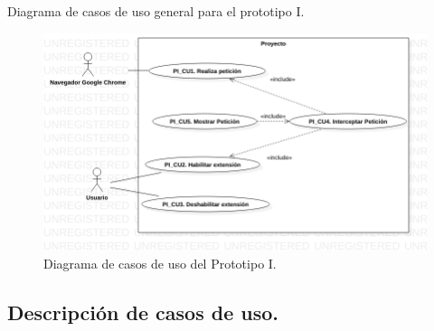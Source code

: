 \documentclass[12pt, a4paper, titlepage]{report}
\begin{document}
				Diagrama de casos de uso general para el prototipo I.
				\begin{figure}[htb]
					\begin{center}
			    	\includegraphics[width=15cm]{./imagenes/Desarrollo/Prototipo_1/UCD_P1.png}
						\caption{Diagrama de casos de uso del Prototipo I.}
					\end{center}
				\end{figure}\newpage	
					
			\subsection{Descripción de casos de uso.}
			
				
\end{document}
